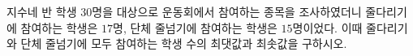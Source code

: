 지수네 반 학생 $30$명을 대상으로 운동회에서 참여하는 종목을 조사하였더니 줄다리기에 참여하는 학생은 $17$명, 단체 줄넘기에 참여하는 학생은 $15$명이었다. 이때 줄다리기와 단체 줄넘기에 모두 참여하는 학생 수의 최댓값과 최솟값을 구하시오.
